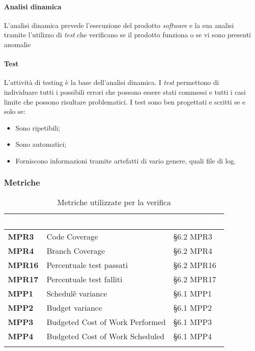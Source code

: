 						\paragraph*{Analisi dinamica}
						\aCapo{}  
							L'analisi dinamica prevede l'esecuzione del prodotto \emph{software} e la sua analisi tramite l'utilizzo di \emph{test} che verificano se il prodotto funziona o se vi sono presenti anomalie
						\paragraph*{Test}
						\aCapo{}  
							L'attività di testing è la base dell'analisi dinamica. I \emph{test} permettono di individuare tutti i possibili errori che possono essere stati commessi e tutti i casi limite che possono risultare problematici. \newline
							I test sono ben progettati e scritti se e solo se:
								\begin{itemize}
									\item Sono ripetibili;
									\item Sono automatici;
									\item Forniscono informazioni tramite artefatti di vario genere, quali file di log.
								\end{itemize}

								
				\subsubsection{Metriche}
					\setlength{\freewidth}{\dimexpr\textwidth-0\tabcolsep}
					\renewcommand{\arraystretch}{1.5}
					\setlength{\aboverulesep}{0pt}
					\setlength{\belowrulesep}{0pt}
					\begin{longtable}{L{.22\freewidth} L{.4\freewidth} L{.2\freewidth}}
						\toprule
						\textcolor{white}{\textbf{Metrica}}&
						\textcolor{white}{\textbf{Descrizione}}&	
						\textcolor{white}{\textbf{Riferimento}}\\
						\toprule
						\endhead
						
						\textbf{MPR3} & Code Coverage & \S 6.2 MPR3 \\
						\textbf{MPR4} & Branch Coverage & \S 6.2 MPR4 \\
						\textbf{MPR16} & Percentuale test passati & \S 6.2 MPR16 \\
						\textbf{MPR17} & Percentuale test falliti & \S 6.2 MPR17 \\
						\textbf{MPP1} & Schedule\G{} variance & \S 6.1 MPP1 \\
						\textbf{MPP2} & Budget variance & \S 6.1 MPP2 \\
						\textbf{MPP3} & Budgeted Cost of Work Performed & \S 6.1 MPP3 \\
						\textbf{MPP4} & Budgeted Cost of Work Scheduled & \S 6.1 MPP4 \\

						\bottomrule
						\caption{Metriche utilizzate per la verifica}
					\end{longtable}
